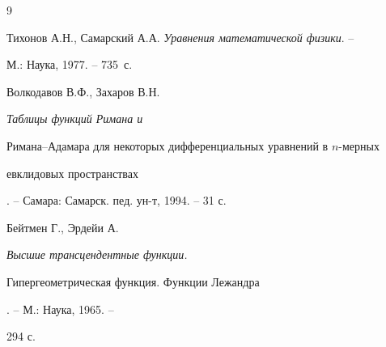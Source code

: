 \begin{thebibliography}{9} 


 




Тихонов А.Н., Самарский А.А. {\em Уравнения математической физики}. -- 


М.: Наука, 1977. -- 735~с. 




Волкодавов В.Ф., Захаров В.Н. {\em Таблицы функций Римана и 


Римана--Адамара для некоторых дифференциальных уравнений в $n$-мерных 


евклидовых пространствах}. -- Самара: Самарск. пед. ун-т, 1994. -- 31 с. 




Бейтмен Г., Эрдейи А. {\em Высшие трансцендентные функции. 


Гипергеометрическая функция. Функции Лежандра}. -- М.: Наука, 1965. -- 


294 с. 


 


 


\end{thebibliography} 


 


\vskip 2cm 


 






 


\label{end} 


 


